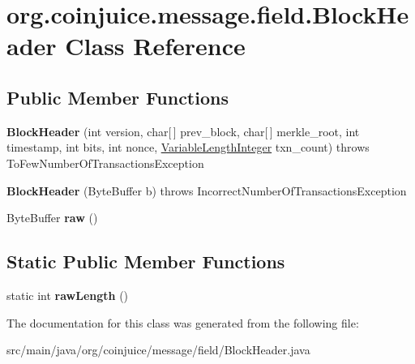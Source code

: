 \hypertarget{classorg_1_1coinjuice_1_1message_1_1field_1_1_block_header}{\section{org.\-coinjuice.\-message.\-field.\-Block\-Header Class Reference}
\label{classorg_1_1coinjuice_1_1message_1_1field_1_1_block_header}
}
\subsection*{Public Member Functions}
\begin{DoxyCompactItemize}
\item 
\hypertarget{classorg_1_1coinjuice_1_1message_1_1field_1_1_block_header_aea5a864ce4bc6cfcf56492b7ee3ba35b}{{\bfseries Block\-Header} (int version, char\mbox{[}$\,$\mbox{]} prev\-\_\-block, char\mbox{[}$\,$\mbox{]} merkle\-\_\-root, int timestamp, int bits, int nonce, \hyperlink{classorg_1_1coinjuice_1_1message_1_1field_1_1_variable_length_integer}{Variable\-Length\-Integer} txn\-\_\-count)  throws To\-Few\-Number\-Of\-Transactions\-Exception }\label{classorg_1_1coinjuice_1_1message_1_1field_1_1_block_header_aea5a864ce4bc6cfcf56492b7ee3ba35b}

\item 
\hypertarget{classorg_1_1coinjuice_1_1message_1_1field_1_1_block_header_a391cd2e196b60442d47946bddb2d2c5a}{{\bfseries Block\-Header} (Byte\-Buffer b)  throws Incorrect\-Number\-Of\-Transactions\-Exception }\label{classorg_1_1coinjuice_1_1message_1_1field_1_1_block_header_a391cd2e196b60442d47946bddb2d2c5a}

\item 
\hypertarget{classorg_1_1coinjuice_1_1message_1_1field_1_1_block_header_a0a0a9139fed4fc2016ada3561a675ab1}{Byte\-Buffer {\bfseries raw} ()}\label{classorg_1_1coinjuice_1_1message_1_1field_1_1_block_header_a0a0a9139fed4fc2016ada3561a675ab1}

\end{DoxyCompactItemize}
\subsection*{Static Public Member Functions}
\begin{DoxyCompactItemize}
\item 
\hypertarget{classorg_1_1coinjuice_1_1message_1_1field_1_1_block_header_ab92aac1fca3048e6bb6d7ecf22ade7dd}{static int {\bfseries raw\-Length} ()}\label{classorg_1_1coinjuice_1_1message_1_1field_1_1_block_header_ab92aac1fca3048e6bb6d7ecf22ade7dd}

\end{DoxyCompactItemize}


The documentation for this class was generated from the following file\-:\begin{DoxyCompactItemize}
\item 
src/main/java/org/coinjuice/message/field/Block\-Header.\-java\end{DoxyCompactItemize}
